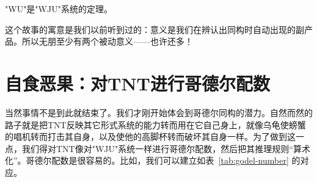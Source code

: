 \begin{block}
"WU"是"WJU"系统的定理。
\end{block}

这个故事的寓意是我们以前听到过的：意义是我们在辨认出同构时自动出现的副产品。所以无朋至少有两个被动意义——也许还多！

\section{自食恶果：对TNT进行哥德尔配数}

当然事情不是到此就结束了。我们才刚开始体会到哥德尔同构的潜力。自然而然的路子就是把TNT反映其它形式系统的能力转而用在它自己身上，就像乌龟使螃蟹的唱机转而打击其自身，以及使他的高脚杯转而破坏其自身一样。为了做到这一点，我们得对TNT像对"WJU"系统一样进行哥德尔配数，然后把其推理规则“算术化”。哥德尔配数是很容易的。比如，我们可以建立如表~\ref{tab:godel-number} 的对应。

